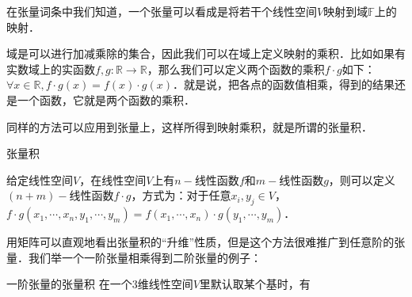 
在张量词条中我们知道，一个张量可以看成是将若干个线性空间$V$映射到域$\mathbb{F}$上的映射．

域是可以进行加减乘除的集合，因此我们可以在域上定义映射的乘积．比如如果有实数域上的实函数$f, g:\mathbb{R}\rightarrow\mathbb{R}$，那么我们可以定义两个函数的乘积$f\cdot g$如下：$\forall x\in\mathbb{R}, f\cdot g(x)=f(x)\cdot g(x)$．就是说，把各点的函数值相乘，得到的结果还是一个函数，它就是两个函数的乘积．

同样的方法可以应用到张量上，这样所得到映射乘积，就是所谓的张量积．

\begin{definition}{张量积}

给定线性空间$V$，在线性空间$V$上有$n-$线性函数$f$和$m-$线性函数$g$，则可以定义$(n+m)-$线性函数$f\cdot g$，方式为：对于任意$x_i, y_j\in V$，$f\cdot g(x_1, \cdots, x_n, y_1, \cdots, y_m)=f(x_1, \cdots, x_n)\cdot g(y_1, \cdots, y_m)$．

\end{definition}

用矩阵可以直观地看出张量积的“升维”性质，但是这个方法很难推广到任意阶的张量．我们举一个一阶张量相乘得到二阶张量的例子：

\begin{example}{一阶张量的张量积}
在一个$3$维线性空间$V$里默认取某个基时，有
\end{example}




